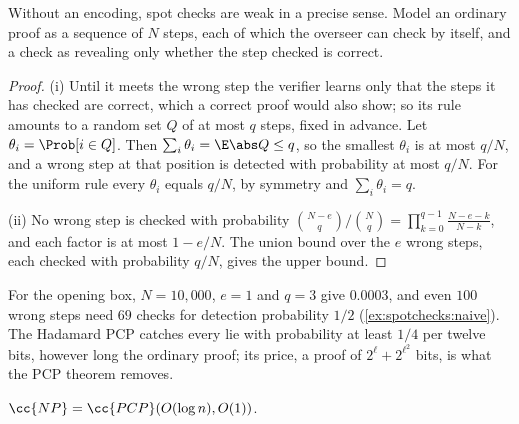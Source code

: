 \begin{refsection}
Without an encoding, spot checks are weak in a precise sense. Model an ordinary proof as a sequence of $N$ steps, each of which the overseer can check by itself, and a check as revealing only whether the step checked is correct.


\begin{proof}
(i) Until it meets the wrong step the verifier learns only that the steps it has checked are correct, which a correct proof would also show; so its rule amounts to a random set $Q$ of at most $q$ steps, fixed in advance. Let $\theta_i=\Prob[i\in Q]$. Then $\sum_i\theta_i=\E\abs Q\le q$, so the smallest $\theta_i$ is at most $q/N$, and a wrong step at that position is detected with probability at most $q/N$. For the uniform rule every $\theta_i$ equals $q/N$, by symmetry and $\sum_i\theta_i=q$.

(ii) No wrong step is checked with probability $\binom{N-e}q\big/\binom Nq=\prod_{k=0}^{q-1}\frac{N-e-k}{N-k}$, and each factor is at most $1-e/N$. The union bound over the $e$ wrong steps, each checked with probability $q/N$, gives the upper bound.
\end{proof}

For the opening box, $N=10{,}000$, $e=1$ and $q=3$ give $0.0003$, and even $100$ wrong steps need $69$ checks for detection probability $1/2$ (\cref{ex:spotchecks:naive}). The Hadamard PCP catches every lie with probability at least $1/4$ per twelve bits, however long the ordinary proof; its price, a proof of $2^\ell+2^{\ell^2}$ bits, is what the PCP theorem removes.

\begin{theorem}\label{thm:spotchecks:pcp}
$\cc{NP}=\cc{PCP}(O(\log n),O(1))$.
\end{theorem}


\end{refsection}
